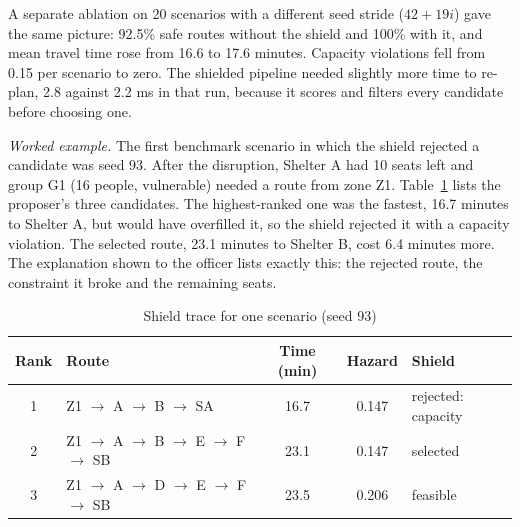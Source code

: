 \documentclass[conference]{IEEEtran}
\begin{document}
A separate ablation on 20 scenarios with a different seed stride ($42+19i$) gave the same picture: 92.5\% safe routes without the shield and 100\% with it, and mean travel time rose from 16.6 to 17.6 minutes. Capacity violations fell from 0.15 per scenario to zero. The shielded pipeline needed slightly more time to re-plan, 2.8 against 2.2 ms in that run, because it scores and filters every candidate before choosing one.

\textit{Worked example.} The first benchmark scenario in which the shield rejected a candidate was seed 93. After the disruption, Shelter A had 10 seats left and group G1 (16 people, vulnerable) needed a route from zone Z1. Table~\ref{tab:shield} lists the proposer's three candidates. The highest-ranked one was the fastest, 16.7 minutes to Shelter A, but would have overfilled it, so the shield rejected it with a capacity violation. The selected route, 23.1 minutes to Shelter B, cost 6.4 minutes more. The explanation shown to the officer lists exactly this: the rejected route, the constraint it broke and the remaining seats.

\begin{table}[t]
\caption{Shield trace for one scenario (seed 93)}
\label{tab:shield}
\centering
\footnotesize
\setlength{\tabcolsep}{3pt}
\begin{tabular}{clccl}
\toprule
Rank & Route & Time (min) & Hazard & Shield\\
\midrule
1 & Z1 $\rightarrow$ A $\rightarrow$ B $\rightarrow$ SA & 16.7 & 0.147 & rejected: capacity\\
2 & Z1 $\rightarrow$ A $\rightarrow$ B $\rightarrow$ E $\rightarrow$ F $\rightarrow$ SB & 23.1 & 0.147 & selected\\
3 & Z1 $\rightarrow$ A $\rightarrow$ D $\rightarrow$ E $\rightarrow$ F $\rightarrow$ SB & 23.5 & 0.206 & feasible\\
\bottomrule
\end{tabular}
\end{table}
\end{document}
